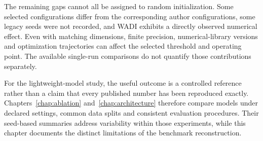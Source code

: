 The remaining gaps cannot all be assigned to random initialization.
Some selected configurations differ from the corresponding author
configurations, some legacy seeds were not recorded, and WADI exhibits
a directly observed numerical effect. Even with matching dimensions,
finite precision, numerical-library versions and optimization trajectories
can affect the selected threshold and operating point. The available
single-run comparisons do not quantify those contributions separately.

For the lightweight-model study, the useful outcome is a controlled
reference rather than a claim that every published number has been
reproduced exactly. Chapters~\ref{chap:ablation}
and~\ref{chap:architecture} therefore compare models under declared
settings, common data splits and consistent evaluation procedures.
Their seed-based summaries address variability within those experiments,
while this chapter documents the distinct limitations of the benchmark
reconstruction.
